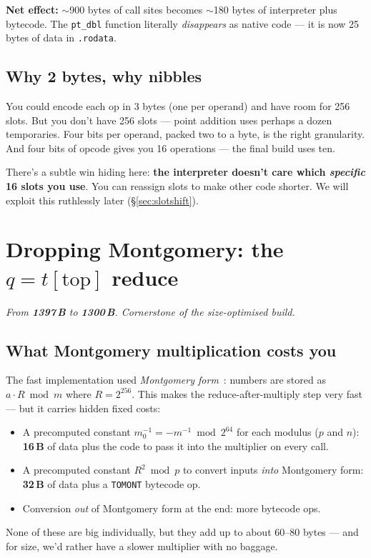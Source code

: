 \documentclass[11pt,a4paper]{article}
\newcommand{\bytes}[1]{\textcolor{blue!60!black}{\textbf{#1\,B}}}
\begin{document}
\textbf{Net effect:} $\sim$900 bytes of call sites becomes $\sim$180
bytes of interpreter plus bytecode. The \texttt{pt\_dbl} function
literally \emph{disappears} as native code --- it is now 25 bytes of
data in \texttt{.rodata}.

\subsection{Why 2 bytes, why nibbles}

You could encode each op in 3 bytes (one per operand) and have room
for 256 slots. But you don't have 256 slots --- point addition
uses perhaps a dozen temporaries. Four bits per operand, packed two to
a byte, is the right granularity. And four bits of opcode gives you 16
operations --- the final build uses ten.

There's a subtle win hiding here: \textbf{the interpreter doesn't
care which \emph{specific} 16 slots you use}. You can reassign slots
to make other code shorter. We will exploit this ruthlessly later
(\S\ref{sec:slotshift}).

\section{Dropping Montgomery: the $q = t[\text{top}]$ reduce}
\label{sec:nomont}

\noindent\emph{From \bytes{1397} to \bytes{1300}. Cornerstone of the
size-optimised build.}

\subsection{What Montgomery multiplication costs you}

The fast implementation used \emph{Montgomery form}~\cite{montgomery}:
numbers are stored as $a \cdot R \bmod m$ where $R = 2^{256}$. This
makes the reduce-after-multiply step very fast --- but it carries
hidden fixed costs:
\begin{itemize}
\item A precomputed constant $m_0^{-1} = -m^{-1} \bmod 2^{64}$ for
  each modulus ($p$ and $n$): \bytes{16} of data plus the code to
  pass it into the multiplier on every call.
\item A precomputed constant $R^2 \bmod p$ to convert inputs
  \emph{into} Montgomery form: \bytes{32} of data plus a
  \texttt{TOMONT} bytecode op.
\item Conversion \emph{out} of Montgomery form at the end: more
  bytecode ops.
\end{itemize}
None of these are big individually, but they add up to about 60--80
bytes --- and for size, we'd rather have a slower multiplier with no
baggage.
\end{document}
